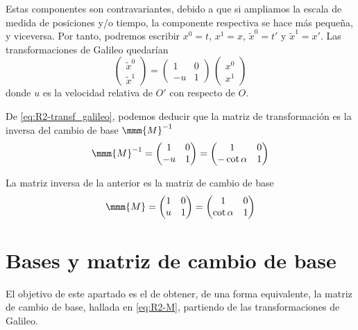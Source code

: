 Estas componentes son contravariantes, debido a que si ampliamos la escala de medida de posiciones y/o tiempo, la componente respectiva se hace más pequeña, y viceversa.
Por tanto, podremos escribir $x^0 = t$, $x^1 = x$, $\tilde{x}^0 = t'$ y
$\tilde{x}^1 = x'$.
Las transformaciones de Galileo quedarían
\begin{equation}
  \label{eq:R2-transf_galileo}
  \begin{pmatrix}
    \tilde{x}^0\\
    \tilde{x}^1
  \end{pmatrix}
  = \begin{pmatrix}
    1 & 0 \\
    -u & 1
  \end{pmatrix}
  \,
  \begin{pmatrix}
    x^0\\
    x^1
  \end{pmatrix}
\end{equation}
donde $u$ es la velocidad relativa de $O'$ con respecto de $O$.

De \eqref{eq:R2-transf_galileo}, podemos deducir que la matriz de transformación es la
inversa del cambio de base $\mmm{M}^{-1}$
\begin{equation}
  \mmm{M}^{-1}
  =
  \begin{pmatrix}
    1 & 0\\
    -u & 1
  \end{pmatrix}
  =
  \begin{pmatrix}
    1 & 0\\
    -\cot\alpha & 1
  \end{pmatrix}
\end{equation}

La matriz inversa de la anterior es la matriz de cambio de base
\begin{equation}
  \label{eq:R2-M}
  \mmm{M}
  =
  \begin{pmatrix}
    1 & 0\\
    u & 1
  \end{pmatrix}
  =
  \begin{pmatrix}
    1 & 0\\
    \cot\alpha & 1
  \end{pmatrix}
\end{equation}

\section{Bases y matriz de cambio de base}
El objetivo de este apartado es el de obtener, de una forma equivalente, la matriz de
cambio de base, hallada en \eqref{eq:R2-M}, partiendo de las transformaciones de Galileo.

